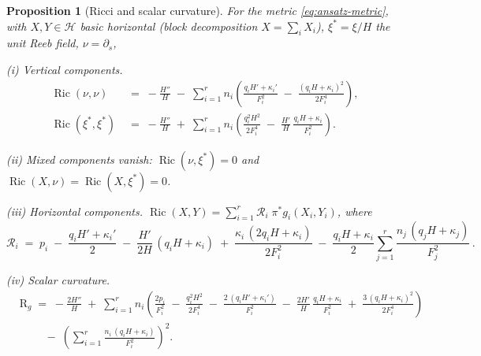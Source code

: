 \documentclass[11pt]{amsart}
\theoremstyle{plain}
\numberwithin{equation}{section}
\newtheorem{proposition}[theorem]{Proposition}
\theoremstyle{definition}
\theoremstyle{remark}
\begin{document}
\begin{proposition}[Ricci and scalar curvature]\label{prop:ricci-ansatz}
	For the metric \eqref{eq:ansatz-metric}, with $X, Y \in \mathcal{H}$ basic horizontal (block decomposition $X = \sum_i X_i$), $\xi^* = \xi/H$ the unit Reeb field, $\nu = \partial_s$, %
	
	\emph{(i) Vertical components.}
	\begin{align}
		\label{eq:Ric-nu}
		\operatorname{Ric}(\nu, \nu) &\;=\; -\frac{H''}{H} \;-\; \sum_{i=1}^r n_i \left( \frac{q_i H' + \kappa_i'}{F_i^2} \;-\; \frac{(q_i H + \kappa_i)^2}{2 F_i^4} \right),\\
	\label{eq:Ric-xi}
		\operatorname{Ric}(\xi^*, \xi^*) &\;=\; -\frac{H''}{H} \;+\; \sum_{i=1}^r n_i \left( \frac{q_i^2 H^2}{2 F_i^4} \;-\; \frac{H'}{H}\, \frac{q_i H + \kappa_i}{F_i^2} \right).
	\end{align}
	
	\emph{(ii) Mixed components vanish:} $\operatorname{Ric}(\nu, \xi^*) = 0$ and $\operatorname{Ric}(X, \nu) = \operatorname{Ric}(X, \xi^*) = 0$.
	
	\emph{(iii) Horizontal components.} $\operatorname{Ric}(X, Y) = \sum_{i=1}^r \mathcal{R}_i\; \pi^*g_i(X_i, Y_i)$, where
	\begin{equation}\label{eq:Ric-horizontal}
		\mathcal{R}_i \;=\; p_i \;-\; \frac{q_i H' + \kappa_i'}{2} \;-\; \frac{H'}{2H}\,(q_i H + \kappa_i) \;+\; \frac{\kappa_i\,(2 q_i H + \kappa_i)}{2 F_i^2} \;-\; \frac{q_i H + \kappa_i}{2} \sum_{j=1}^r \frac{n_j\,(q_j H + \kappa_j)}{F_j^2} \,.
	\end{equation}
	
	\emph{(iv) Scalar curvature.}
		\begin{equation}\label{eq:scalar-curvature}
		\begin{aligned}
			&\mathrm{R}_g \;=\; -\frac{2H''}{H} \;+\; \sum_{i=1}^r n_i \left( \frac{2 p_i}{F_i^2} \;-\; \frac{q_i^2 H^2}{2 F_i^4} \;-\; \frac{2\,(q_i H' + \kappa_i')}{F_i^2} \;-\; \frac{2H'}{H}\, \frac{q_i H + \kappa_i}{F_i^2} \;+\; \frac{3\,(q_i H + \kappa_i)^2}{2 F_i^4} \right) \\
			&\qquad \;-\; \left( \sum_{i=1}^r \frac{n_i\,(q_i H + \kappa_i)}{F_i^2} \right)^{2} .
		\end{aligned}
	\end{equation}
	
\end{proposition}
\end{document}
